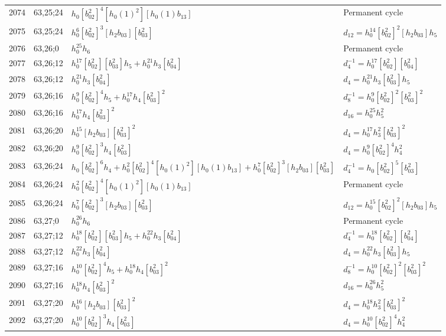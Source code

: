 \documentclass{article}
\begin{document}
\begin{longtable}{|l|l|>{\raggedright\arraybackslash}p{6cm}|>{\raggedright\arraybackslash}p{6cm}|}
2074 & 63,25;24 & $h_0[b_{02}^2]^4[h_0(1)^2][h_0(1)b_{13}]$ & Permanent cycle\\
2075 & 63,25;24 & $h_0^6[b_{02}^2]^3[h_2b_{03}][b_{03}^2]$ &$d_{12}=h_0^{14}[b_{02}^2]^2[h_2b_{03}]h_5$\\
\hline
2076 & 63,26;0 & $h_0^{25}h_6$ & Permanent cycle\\
\hline
2077 & 63,26;12 & $h_0^{17}[b_{02}^2][b_{03}^2]h_5 + h_0^{21}h_3[b_{04}^2]$ & $d_{4}^{-1}=h_0^{17}[b_{02}^2][b_{04}^2]$\\
2078 & 63,26;12 & $h_0^{21}h_3[b_{04}^2]$ &$d_{4}=h_0^{21}h_3[b_{03}^2]h_5$\\
\hline
2079 & 63,26;16 & $h_0^9[b_{02}^2]^4h_5 + h_0^{17}h_4[b_{03}^2]^2$ & $d_{8}^{-1}=h_0^9[b_{02}^2]^2[b_{03}^2]^2$\\
2080 & 63,26;16 & $h_0^{17}h_4[b_{03}^2]^2$ &$d_{16}=h_0^{25}h_5^2$\\
\hline
2081 & 63,26;20 & $h_0^{15}[h_2b_{03}][b_{03}^2]^2$ &$d_{4}=h_0^{17}h_3^2[b_{03}^2]^2$\\
2082 & 63,26;20 & $h_0^9[b_{02}^2]^3h_4[b_{03}^2]$ &$d_{4}=h_0^9[b_{02}^2]^4h_4^2$\\
\hline
2083 & 63,26;24 & $h_0[b_{02}^2]^6h_4 + h_0^2[b_{02}^2]^4[h_0(1)^2][h_0(1)b_{13}] + h_0^7[b_{02}^2]^3[h_2b_{03}][b_{03}^2]$ & $d_{4}^{-1}=h_0[b_{02}^2]^5[b_{03}^2]$\\
2084 & 63,26;24 & $h_0^2[b_{02}^2]^4[h_0(1)^2][h_0(1)b_{13}]$ & Permanent cycle\\
2085 & 63,26;24 & $h_0^7[b_{02}^2]^3[h_2b_{03}][b_{03}^2]$ &$d_{12}=h_0^{15}[b_{02}^2]^2[h_2b_{03}]h_5$\\
\hline
2086 & 63,27;0 & $h_0^{26}h_6$ & Permanent cycle\\
\hline
2087 & 63,27;12 & $h_0^{18}[b_{02}^2][b_{03}^2]h_5 + h_0^{22}h_3[b_{04}^2]$ & $d_{4}^{-1}=h_0^{18}[b_{02}^2][b_{04}^2]$\\
2088 & 63,27;12 & $h_0^{22}h_3[b_{04}^2]$ &$d_{4}=h_0^{22}h_3[b_{03}^2]h_5$\\
\hline
2089 & 63,27;16 & $h_0^{10}[b_{02}^2]^4h_5 + h_0^{18}h_4[b_{03}^2]^2$ & $d_{8}^{-1}=h_0^{10}[b_{02}^2]^2[b_{03}^2]^2$\\
2090 & 63,27;16 & $h_0^{18}h_4[b_{03}^2]^2$ &$d_{16}=h_0^{26}h_5^2$\\
\hline
2091 & 63,27;20 & $h_0^{16}[h_2b_{03}][b_{03}^2]^2$ &$d_{4}=h_0^{18}h_3^2[b_{03}^2]^2$\\
2092 & 63,27;20 & $h_0^{10}[b_{02}^2]^3h_4[b_{03}^2]$ &$d_{4}=h_0^{10}[b_{02}^2]^4h_4^2$\\
\hline

\end{longtable}
\end{document}
